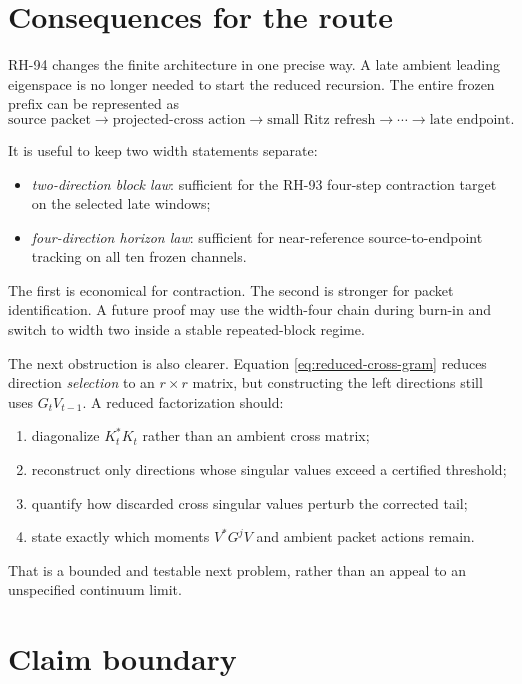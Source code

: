 \documentclass[11pt]{article}
\theoremstyle{definition}
\theoremstyle{remark}
\begin{document}
\section{Consequences for the route}
\label{sec:route}

RH-94 changes the finite architecture in one precise way.  A late ambient
leading eigenspace is no longer needed to start the reduced recursion.  The
entire frozen prefix can be represented as
\[
 \text{source packet}
 \longrightarrow
 \text{projected-cross action}
 \longrightarrow
 \text{small Ritz refresh}
 \longrightarrow\cdots\longrightarrow
 \text{late endpoint}.
\]

It is useful to keep two width statements separate:
\begin{itemize}[leftmargin=2em]
\item \emph{two-direction block law}: sufficient for the RH-93 four-step
contraction target on the selected late windows;
\item \emph{four-direction horizon law}: sufficient for near-reference
source-to-endpoint tracking on all ten frozen channels.
\end{itemize}
The first is economical for contraction.  The second is stronger for packet
identification.  A future proof may use the width-four chain during burn-in
and switch to width two inside a stable repeated-block regime.

The next obstruction is also clearer.  Equation
\eqref{eq:reduced-cross-gram} reduces direction \emph{selection} to an
$r\times r$ matrix, but constructing the left directions still uses
$G_tV_{t-1}$.  A reduced factorization should:
\begin{enumerate}[leftmargin=2em]
\item diagonalize $K_t^*K_t$ rather than an ambient cross matrix;
\item reconstruct only directions whose singular values exceed a certified
threshold;
\item quantify how discarded cross singular values perturb the corrected
tail;
\item state exactly which moments $V^*G^jV$ and ambient packet actions remain.
\end{enumerate}
That is a bounded and testable next problem, rather than an appeal to an
unspecified continuum limit.

\section{Claim boundary}
\end{document}

